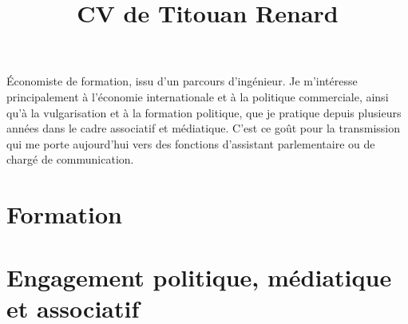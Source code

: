 \documentclass[a4paper,online]{adcv}
\title{CV de Titouan Renard}
\begin{document}
Économiste de formation, issu d'un parcours d'ingénieur. Je m'intéresse principalement à l'économie internationale et à la politique commerciale, ainsi qu'à la vulgarisation et à la formation politique, que je pratique depuis plusieurs années dans le cadre associatif et médiatique. C'est ce goût pour la transmission qui me porte aujourd'hui vers des fonctions d'assistant parlementaire ou de chargé de communication.

\section{Formation}

\begin{adcvtabletwo}
\end{adcvtabletwo}



\section{Engagement politique, médiatique et associatif}
\end{document}
